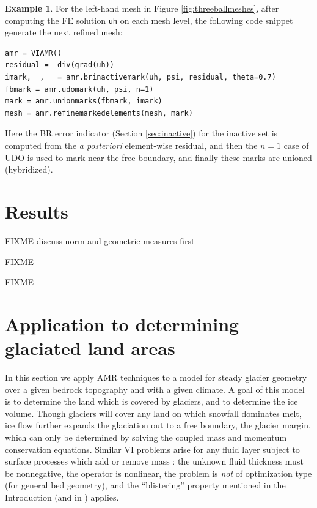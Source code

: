 \documentclass[]{interact}
\theoremstyle{plain}%
\theoremstyle{definition}
\newtheorem{example}[theorem]{Example}
\theoremstyle{remark}
\begin{document}
\begin{example} \label{example:hybrid}
For the left-hand mesh in Figure \ref{fig:threeballmeshes}, after computing the FE solution \texttt{uh} on each mesh level, the following code snippet generate the next refined mesh:
\begin{verbatim}
amr = VIAMR()
residual = -div(grad(uh))
imark, _, _ = amr.brinactivemark(uh, psi, residual, theta=0.7)
fbmark = amr.udomark(uh, psi, n=1)
mark = amr.unionmarks(fbmark, imark)
mesh = amr.refinemarkedelements(mesh, mark)
\end{verbatim}
Here the BR error indicator (Section \ref{sec:inactive}) for the inactive set is computed from the \emph{a posteriori} element-wise residual, and then the $n=1$ case of UDO is used to mark near the free boundary, and finally these marks are unioned (hybridized).
\end{example}



\section{Results} \label{sec:results}

FIXME discuss norm and geometric measures first

FIXME \cite{Kosub2016} \cite{JungeblutKleistMiltzow2022}

FIXME


\section{Application to determining glaciated land areas} \label{sec:app}

In this section we apply AMR techniques to a model for steady glacier geometry over a given bedrock topography and with a given climate.  A goal of this model is to determine the land which is covered by glaciers, and to determine the ice volume.  Though glaciers will cover any land on which snowfall dominates melt, ice flow further expands the glaciation out to a free boundary, the glacier margin, which can only be determined by solving the coupled mass and momentum conservation equations.  Similar VI problems arise for any fluid layer subject to surface processes which add or remove mass \cite{Bueler2021b}: the unknown fluid thickness must be nonnegative, the operator is nonlinear, the problem is \emph{not} of optimization type (for general bed geometry), and the ``blistering'' property mentioned in the Introduction (and in \cite{JouvetBueler2012}) applies.
\end{document}
